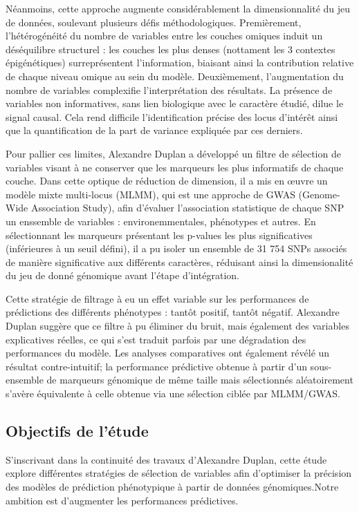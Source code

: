 \documentclass[
  11pt,
  letterpaper,
  DIV=11,
  numbers=noendperiod]{scrartcl}
\begin{document}
Néanmoins, cette approche augmente considérablement la dimensionnalité
du jeu de données, soulevant plusieurs défis méthodologiques.
Premièrement, l'hétérogénéité du nombre de variables entre les couches
omiques induit un déséquilibre structurel : les couches les plus denses
(nottament les 3 contextes épigénétiques) surreprésentent l'information,
biaisant ainsi la contribution relative de chaque niveau omique au sein
du modèle. Deuxièmement, l'augmentation du nombre de variables
complexifie l'interprétation des résultats. La présence de variables non
informatives, sans lien biologique avec le caractère étudié, dilue le
signal causal. Cela rend difficile l'identification précise des locus
d'intérêt ainsi que la quantification de la part de variance expliquée
par ces derniers.

Pour pallier ces limites, Alexandre Duplan a développé un filtre de
sélection de variables visant à ne conserver que les marqueurs les plus
informatifs de chaque couche. Dans cette optique de réduction de
dimension, il a mis en œuvre un modèle mixte multi-locus (MLMM), qui est
une approche de GWAS (Genome-Wide Association Study), afin d'évaluer
l'association statistique de chaque SNP un enssemble de variables :
environemmentales, phénotypes et autres. En sélectionnant les marqueurs
présentant les p-values les plus significatives (inférieures à un seuil
défini), il a pu isoler un ensemble de 31 754 SNPs associés de manière
significative aux différents caractères, réduisant ainsi la
dimensionalité du jeu de donné génomique avant l'étape d'intégration.

Cette stratégie de filtrage à eu un effet variable sur les performances
de prédictions des différents phénotypes : tantôt positif, tantôt
négatif. Alexandre Duplan suggère que ce filtre à pu éliminer du bruit,
mais également des variables explicatives réelles, ce qui s'est traduit
parfois par une dégradation des performances du modèle. Les analyses
comparatives ont également révélé un résultat contre-intuitif; la
performance prédictive obtenue à partir d'un sous-ensemble de marqueurs
génomique de même taille mais sélectionnés aléatoirement s'avère
équivalente à celle obtenue via une sélection ciblée par MLMM/GWAS.

\hypertarget{objectifs-de-luxe9tude}{%
\subsection{Objectifs de l'étude}\label{objectifs-de-luxe9tude}}

S'inscrivant dans la continuité des travaux d'Alexandre Duplan, cette
étude explore différentes stratégies de sélection de variables afin
d'optimiser la précision des modèles de prédiction phénotypique à partir
de données génomiques.Notre ambition est d'augmenter les performances
prédictives.
\end{document}
